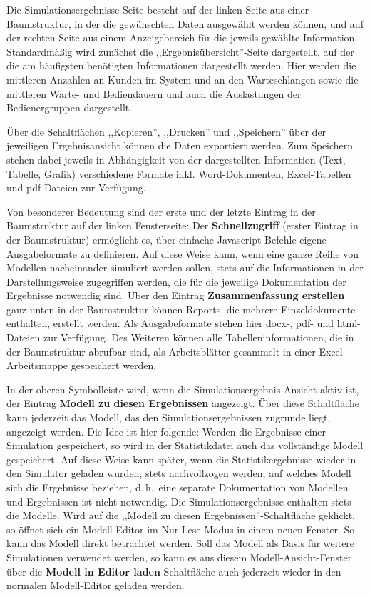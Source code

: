 \documentclass[deutsch]{svmono}
\begin{document}
Die Simulationsergebnisse-Seite besteht auf der linken Seite aus einer Baumstruktur, in der die gewünschten Daten ausgewählt werden können, und auf der rechten Seite aus einem Anzeigebereich für die jeweils gewählte Information. Standardmäßig wird zunächst die ,,Ergebnisübersicht''-Seite dargestellt, auf der die am häufigsten benötigten Informationen dargestellt werden. Hier werden die mittleren Anzahlen an Kunden im System und an den Warteschlangen sowie die mittleren Warte- und Bediendauern und auch die Auslastungen der Bedienergruppen dargestellt.

Über die Schaltflächen ,,Kopieren'', ,,Drucken'' und ,,Speichern'' über der jeweiligen Ergebnisansicht können die Daten exportiert werden. Zum Speichern stehen dabei jeweils in Abhängigkeit von der dargestellten Information (Text, Tabelle, Grafik) verschiedene Formate inkl. Word-Dokumenten, Excel-Tabellen und pdf-Dateien zur Verfügung.

Von besonderer Bedeutung sind der erste und der letzte Eintrag in der Baumstruktur auf der linken Fensterseite: Der \textbf{Schnellzugriff} (erster Eintrag in der Baumstruktur) ermöglicht es, über einfache Javascript-Befehle eigene Ausgabeformate zu definieren. Auf diese Weise kann, wenn eine ganze Reihe von Modellen nacheinander simuliert werden sollen, stets auf die Informationen in der Darstellungsweise zugegriffen werden, die für die jeweilige Dokumentation der Ergebnisse notwendig sind. Über den Eintrag \textbf{Zusammenfassung erstellen} ganz unten in der Baumstruktur können Reports, die mehrere Einzeldokumente enthalten, erstellt werden. Als Ausgabeformate stehen hier docx-, pdf- und html-Dateien zur Verfügung. Des Weiteren können alle Tabelleninformationen, die in der Baumstruktur abrufbar sind, als Arbeitsblätter gesammelt in einer Excel-Arbeitsmappe gespeichert werden.

In der oberen Symbolleiste wird, wenn die Simulationsergebnis-Ansicht aktiv ist, der Eintrag \textbf{Modell zu diesen Ergebnissen} angezeigt. Über diese Schaltfläche kann jederzeit das Modell, das den Simulationsergebnissen zugrunde liegt, angezeigt werden. Die Idee ist hier folgende: Werden die Ergebnisse einer Simulation gespeichert, so wird in der Statistikdatei auch das vollständige Modell gespeichert. Auf diese Weise kann später, wenn die Statistikergebnisse wieder in den Simulator geladen wurden, stets nachvollzogen werden, auf welches Modell sich die Ergebnisse beziehen, d.\,h.\ eine separate Dokumentation von Modellen und Ergebnissen ist nicht notwendig. Die Simulationsergebnisse enthalten stets die Modelle. Wird auf die ,,Modell zu diesen Ergebnissen''-Schaltfläche geklickt, so öffnet sich ein Modell-Editor im Nur-Lese-Modus in einem neuen Fenster. So kann das Modell direkt betrachtet werden. Soll das Modell als Basis für weitere Simulationen verwendet werden, so kann es aus diesem Modell-Ansicht-Fenster über die \textbf{Modell in Editor laden} Schaltfläche auch jederzeit wieder in den normalen Modell-Editor geladen werden.
\end{document}
